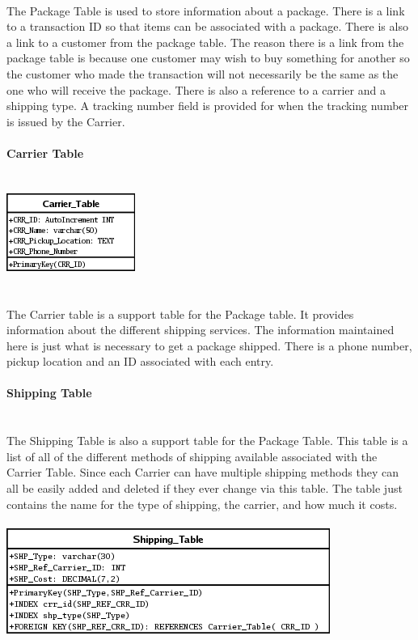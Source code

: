 \documentclass{report}
\begin{document}
\begin{itemize}
        \\
        The Package Table is used to store information about a package. There is a link to a transaction ID
        so that items can be associated with a package. There is also a link to a customer from the package
        table. The reason there is a link from the package table is because one customer may wish to buy
        something for another so the customer who made the transaction will not necessarily be the same as
        the one who will receive the package. There is also a reference to a carrier and a shipping type.
        A tracking number field is provided for when the tracking number is issued by the Carrier.
        \\
        \\
        {\bf Carrier Table}\\
        \\
        \\
        \includegraphics{Tables/CarrierTable.png}\\
        \\
        \\
        The Carrier table is a support table for the Package table. It provides information about the different
        shipping services. The information maintained here is just what is necessary to get a package shipped.
        There is a phone number, pickup location and an ID associated with each entry.
        \\
        \\
        {\bf Shipping Table}\\
        \\
        \\
        The Shipping Table is also a support table for the Package Table. This table is a list of all of the
        different methods of shipping available associated with the Carrier Table. Since each Carrier can
        have multiple shipping methods they can all be easily added and deleted if they ever change via
        this table. The table just contains the name for the type of shipping, the carrier, and how much
        it costs.\\
        \\
        \includegraphics{Tables/ShippingTable.png}\\
        \\

\end{itemize}
\end{document}
